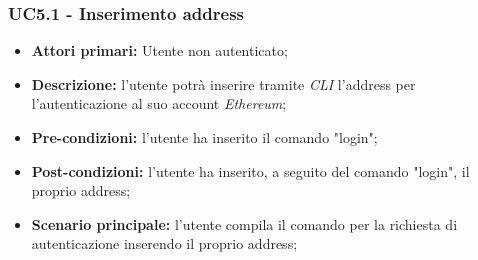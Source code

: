 \subsubsection{UC5.1 - Inserimento address}
\begin{itemize}
	\item \textbf{Attori primari:} Utente non autenticato;
	\item \textbf{Descrizione:} l'utente potrà inserire tramite \textit{CLI\glo} l'address per l'autenticazione al suo account \textit{Ethereum\glos}; 
	\item \textbf{Pre-condizioni:} l'utente ha inserito il comando "login";
	\item \textbf{Post-condizioni:} l'utente ha inserito, a seguito del comando "login", il proprio address;
	\item \textbf{Scenario principale:} l'utente compila il comando per la richiesta di autenticazione inserendo il proprio address;
\end{itemize}